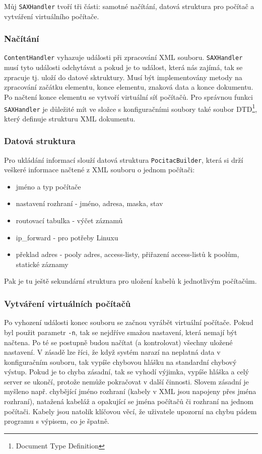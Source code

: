 Můj \verb|SAXHandler| tvoří tři části: samotné načítání, datová struktura pro počítač a vytváření virtuálního počítače.

\subsubsection{Načítání}
\verb|ContentHandler| vyhazuje události při zpracování XML souboru. \verb|SAXHandler| musí tyto události odchytávat a pokud je to událost, která nás zajímá, tak se zpracuje tj. uloží do datové sktruktury. Musí být implementovány metody na zpracování začátku elementu, konce elementu, znaková data a konce dokumentu. Po načtení konce elementu se vytvoří virtuální síť počítačů. Pro správnou funkci \verb|SAXHandler| je důležité mít ve složce s konfiguračními soubory také soubor DTD\footnote{Document Type Definition}, který definuje strukturu XML dokumentu.

\subsubsection{Datová struktura}
Pro ukládání informací slouží datová struktura \verb|PocitacBuilder|, která si drží veškeré informace načtené z XML souboru o jednom počítači:
\begin{itemize}
 \item jméno a typ počítače
 \item nastavení rozhraní - jméno, adresa, maska, stav
 \item routovací tabulka - výčet záznamů
 \item ip\_forward - pro potřeby Linuxu
 \item překlad adres - pooly adres, access-listy, přiřazení access-listů k poolům, statické záznamy
\end{itemize}

Pak je tu ještě sekundární struktura pro uložení kabelů k jednotlivým počítačům.

\subsubsection{Vytváření virtuálních počítačů}
Po vyhození události konec souboru se začnou vyrábět virtuální počítače. Pokud byl použit parametr \verb|-n|, tak se nejdříve smažou nastavení, která nemají být načtena. Po té se postupně budou načítat (a kontrolovat) všechny uložené nastavení. V zásadě lze říci, že když systém narazí na neplatná data v konfiguračním souboru, tak vypíše chybovou hlášku na standardní chybový výstup. Pokud je to chyba zásadní, tak se vyhodí výjimka, vypíše hláška a celý server se ukončí, protože nemůže pokračovat v další činnosti. Slovem zásadní je myšleno např. chybějící jméno rozhraní (kabely v XML jsou napojeny přes jména rozhraní), natažená kabeláž a opakující se jména počítačů či rozhraní na jednom počítači. Kabely jsou natolik klíčovou věcí, že uživatele upozorní na chybu pádem programu s výpisem, co je špatně. 

